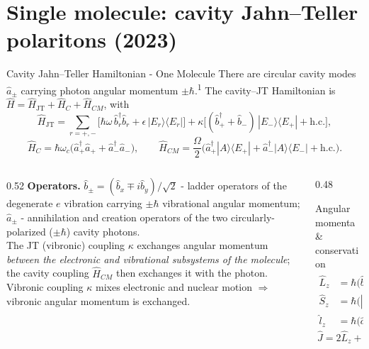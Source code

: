 \documentclass[aspectratio=169,11pt]{beamer}
\newcommand{\refmark}[1]{\textsuperscript{\color{srcgray}#1}}
\begin{document}
\section{Single molecule: cavity Jahn--Teller polaritons (2023)}
\begin{frame}{Cavity Jahn--Teller Hamiltonian - One Molecule}
  \small
 There are circular cavity modes $\hat a_\pm$ carrying photon angular momentum
  $\pm\hbar$.\refmark{1} The cavity--JT Hamiltonian is
  $\hat H=\hat H_{\mathrm{JT}}+\hat H_{C}+\hat H_{CM}$, with
  \[
    \hat H_{\mathrm{JT}}=\!\!\sum_{r=+,-}\!\!\big[\hbar\omega\,\hat b_r^\dagger \hat b_r
      + \epsilon\,|E_r\rangle\langle E_r|\big]
      + \kappa\big[(\hat b_+^\dagger+\hat b_-)\,|E_-\rangle\langle E_+| + \text{h.c.}\big],
  \]
  \[
    \hat H_{C}=\hbar\omega_c\big(\hat a_+^\dagger \hat a_+ + \hat a_-^\dagger \hat a_-\big),
    \qquad
    \hat H_{CM}=\frac{\Omega}{2}\big(\hat a_+^\dagger |A\rangle\langle E_+|
      + \hat a_-^\dagger |A\rangle\langle E_-| + \text{h.c.}\big).
  \]
  \begin{columns}[T]
    \begin{column}{0.52\textwidth}
      \scriptsize
      \textbf{Operators.}
      $\hat b_\pm=(\hat b_x\mp i\hat b_y)/\sqrt2$ - ladder operators of the
      degenerate $e$ vibration carrying $\pm\hbar$ vibrational angular momentum;
      $\hat a_\pm$ - annihilation and creation operators of the two circularly-polarized
      ($\pm\hbar$) cavity photons.\\[0.4em]
      The JT (vibronic) coupling $\kappa$ exchanges angular momentum
      \emph{between the electronic and vibrational subsystems of the molecule};
      the cavity coupling $\hat H_{CM}$ then exchanges it with the photon.
      Vibronic coupling $\kappa$ mixes electronic and nuclear motion
      $\Rightarrow$ vibronic angular momentum is exchanged.
    \end{column}
    \begin{column}{0.48\textwidth}
      \begin{block}{Angular momenta \& conservation}
      \scriptsize
      \vspace{-0.7em}
      \begin{align*}
        \hat L_z &= \hbar\big(\hat b_+^\dagger\hat b_+-\hat b_-^\dagger\hat b_-\big)
          &&\text{vibrational}\\
        \hat S_z &= \hbar\big(|E_+\rangle\langle E_+|-|E_-\rangle\langle E_-|\big)
          &&\text{electronic}\\
        \hat l_z &= \hbar\big(\hat a_+^\dagger\hat a_+-\hat a_-^\dagger\hat a_-\big)
          &&\text{photonic}
      \end{align*}
      \vspace{-0.6em}
      \[ \boxed{\ \hat J = 2\hat L_z + \hat S_z + \hat l_z\ }\ \text{is conserved.} \]
      \end{block}
    \end{column}
  \end{columns}
\end{frame}
\end{document}

